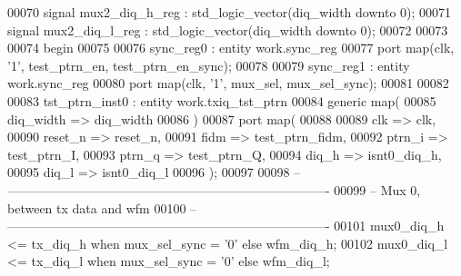 \begin{DoxyCode}
00070 \textcolor{keywordflow}{signal} \textcolor{vhdlchar}{mux2_diq_h_reg}      \textcolor{vhdlchar}{:} \textcolor{comment}{std\_logic\_vector}\textcolor{vhdlchar}{(}\textcolor{vhdlchar}{diq_width} \textcolor{keywordflow}{downto} \textcolor{vhdllogic}{}\textcolor{vhdllogic}{0}\textcolor{vhdlchar}{)};
00071 \textcolor{keywordflow}{signal} \textcolor{vhdlchar}{mux2_diq_l_reg}      \textcolor{vhdlchar}{:} \textcolor{comment}{std\_logic\_vector}\textcolor{vhdlchar}{(}\textcolor{vhdlchar}{diq_width} \textcolor{keywordflow}{downto} \textcolor{vhdllogic}{}\textcolor{vhdllogic}{0}\textcolor{vhdlchar}{)};
00072 
00073   
00074 \textcolor{vhdlkeyword}{begin}
00075 
00076 sync\_reg0 : \textcolor{keywordflow}{entity} work.sync_reg
00077 \textcolor{keywordflow}{port} \textcolor{keywordflow}{map}(clk, '1', test_ptrn_en, test_ptrn_en_sync\textcolor{vhdlchar}{)};
00078 
00079 sync\_reg1 : \textcolor{keywordflow}{entity} work.sync_reg
00080 \textcolor{keywordflow}{port} \textcolor{keywordflow}{map}(clk, '1', mux_sel, mux_sel_sync\textcolor{vhdlchar}{)};
00081 
00082 
00083 tst\_ptrn\_inst0 : \textcolor{keywordflow}{entity} work.txiq_tst_ptrn
00084    \textcolor{keywordflow}{generic} \textcolor{keywordflow}{map}(
00085       diq_width   => diq_width
00086    \textcolor{vhdlchar}{)}
00087    \textcolor{keywordflow}{port} \textcolor{keywordflow}{map}(
00088 
00089       clk      => clk,
00090       reset_n  => reset_n,
00091       fidm     => test_ptrn_fidm,
00092         ptrn_i  => test_ptrn_I,
00093         ptrn_q  => test_ptrn_Q,
00094       diq_h    => isnt0_diq_h,
00095       diq_l    => isnt0_diq_l
00096         \textcolor{vhdlchar}{)};
00097         
00098 \textcolor{keyword}{-- ----------------------------------------------------------------------------}
00099 \textcolor{keyword}{-- Mux 0, between tx data and wfm}
00100 \textcolor{keyword}{-- ----------------------------------------------------------------------------        }
00101 \textcolor{vhdlchar}{mux0_diq_h} \textcolor{vhdlchar}{<=} \textcolor{vhdlchar}{tx_diq_h} \textcolor{keywordflow}{when} \textcolor{vhdlchar}{mux_sel_sync} \textcolor{vhdlchar}{=} \textcolor{vhdlchar}{'}\textcolor{vhdllogic}{}\textcolor{vhdllogic}{0}\textcolor{vhdlchar}{'} \textcolor{keywordflow}{else} \textcolor{vhdlchar}{wfm_diq_h};
00102 \textcolor{vhdlchar}{mux0_diq_l} \textcolor{vhdlchar}{<=} \textcolor{vhdlchar}{tx_diq_l} \textcolor{keywordflow}{when} \textcolor{vhdlchar}{mux_sel_sync} \textcolor{vhdlchar}{=} \textcolor{vhdlchar}{'}\textcolor{vhdllogic}{}\textcolor{vhdllogic}{0}\textcolor{vhdlchar}{'} \textcolor{keywordflow}{else} \textcolor{vhdlchar}{wfm_diq_l};

\end{DoxyCode}
